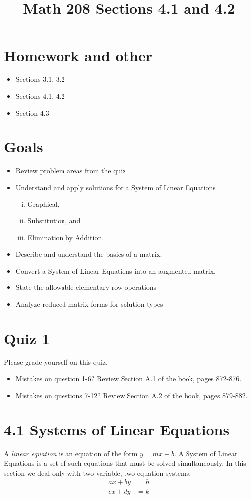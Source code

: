 \documentclass[14pt]{extarticle}
\title{\vspace{-5ex}Math 208 Sections 4.1 and 4.2}
\date{\vspace{-10ex}}
\begin{document}
\maketitle		
\section{Homework and other}
\begin{itemize}
\item Sections 3.1, 3.2
\item Sections 4.1, 4.2
\item Section 4.3
\end{itemize}

\section{Goals}
\begin{itemize}
	\item Review problem areas from the quiz
	\item Understand and apply solutions for a System of Linear Equations 
	\begin{enumerate}[(i)]
		\item Graphical,
		\item Substitution, and
		\item Elimination by Addition.
	\end{enumerate}
	\item Describe and understand the basics of a matrix.
	\item Convert a System of Linear Equations into an augmented matrix.
	\item State the allowable elementary row operations
	\item Analyze reduced matrix forms for solution types
\end{itemize}

\section{Quiz 1}
Please grade yourself on this quiz.
\begin{itemize}
	\item Mistakes on question 1-6? Review Section A.1 of the book, pages 872-876.
	\item Mistakes on questions 7-12? Review Section A.2 of the book, pages 879-882.
\end{itemize}

\section*{4.1 Systems of Linear Equations}
A \textit{linear equation} is an equation of the form $y=mx+b$. A System of Linear Equations is a set of such equations that must be solved simultaneously. In this section we deal only with two variable, two equation systems.
\begin{align*}
	ax+by &=h \\
	cx+dy &=k
\end{align*}
\end{document}
